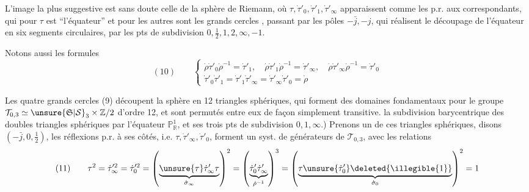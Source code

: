 L'image la plus suggestive est sans doute celle de la sphère de Riemann, où $\tau,\dot\tau'_0,\dot\tau'_1,\dot\tau'_\infty$ apparaissent comme les  p.r. aux  correspondants, qui pour $\tau$ est ``l'équateur'' et pour les autres sont les grands cercles , passant par les pôles $-\bar j,-j$, qui réalisent le découpage de l'équateur en six segments circulaires, par les pts de subdivision $0,\frac12,1,2,\infty,-1$.


Notons aussi les formules
\[
(10)\qquad
\left\{\begin{array}{l}
\dot\rho\dot\tau'_0\dot\rho^{-1}=\dot\tau'_1,\quad
\dot\rho\dot\tau'_1\dot\rho^{-1}=\dot\tau'_\infty,\quad
\dot\rho\dot\tau'_\infty\dot\rho^{-1}=\dot\tau'_0\\[3pt]
\dot\tau'_0\dot\tau'_1=\dot\tau'_1\dot\tau'_\infty=\dot\tau'_\infty\dot\tau'_0=\dot\rho
\end{array}\right.
\]


Les quatre grands cercles (9) découpent la sphère en 12 triangles sphériques, qui forment des domaines fondamentaux pour le groupe $\mathcal T_{0,3}\simeq\unsure{\mathfrak S|\mathcal S}_3\times\mathbb Z/2$ d'ordre 12, et sont permutés entre eux de façon simplement transitive.
 la subdivision barycentrique des doubles triangles sphériques  par l'équateur $\mathbb P_{\mathbb R}^{1}$, et ses trois pts de subdivision $0,1,\infty$.)
Prenons un de ces triangles sphériques, disons $(-\bar j,0,\frac12)$, les réflexions p.r. à ses  côtés, i.e.
$\tau,\dot\tau'_\infty,\dot\tau'_0$, forment un syst. de générateurs de $\mathcal T_{0,3}$, avec les relations
\[
(11)\qquad
\tau^2=\dot\tau_\infty^{\prime 2}=\dot\tau_0^{\prime 2}
=\left(\underbrace{\unsure{\tau}\dot\tau'_\infty\tau}_{\dot\sigma_\infty}\right)^2
=\left(\underbrace{\dot\tau'_0\dot\tau'_\infty}_{\dot\rho^{-1}}\right)^3
=\left(\underbrace{\tau\unsure{\dot\tau'_0}\deleted{\illegible{1}}}_{\dot\sigma_0}\right)^2=1
\]

